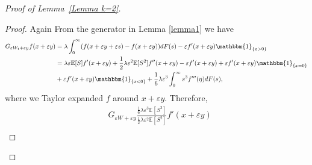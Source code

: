 \documentclass[10pt,a4paper]{amsart}
\begin{document}
\begin{proof}[Proof of Lemma~\ref{Lemma k=2}]
\begin{proof}
Again From the generator in Lemma \ref{lemma1} we have
\begin{align}\label{e2.1}
    G_{\varepsilon W_t+\varepsilon y}f(x+\varepsilon y)&=\lambda \int_0^\infty (f(x+\varepsilon y +\varepsilon s)-f(x+\varepsilon y))dF(s)-\varepsilon f'(x+\varepsilon y)\mathbbm{1}_{\{x>0\}}\\
  \nonumber   &=\lambda \varepsilon \mathbb E[S]f'(x+\varepsilon y)+\frac{1}{2}\lambda \varepsilon^2 \mathbb E[S^2]f''(x+\varepsilon y)-\varepsilon f'(x+\varepsilon y)+\varepsilon f'(x+\varepsilon y)\mathbbm{1}_{\{x=0\}} \nonumber \\
  &+\varepsilon f'(x+\varepsilon y)\mathbbm{1}_{\{x<0\}}
  +\frac{1}{6}\lambda \varepsilon^3 \int_0^\infty s^3 f'''(\eta)dF(s),
\end{align}
where we Taylor expanded $f$ around $x+\varepsilon y$. Therefore,
\begin{align*}
  & G_{\varepsilon W+\varepsilon y}\frac{\frac{1}{6}\lambda \varepsilon^3 \mathbb E[S^3]}{\frac{1}{2}\lambda \varepsilon^2 \mathbb E[S^2]}f'(x+\varepsilon y)\\

\end{align*}
\end{proof}
\end{proof}
\end{document}
